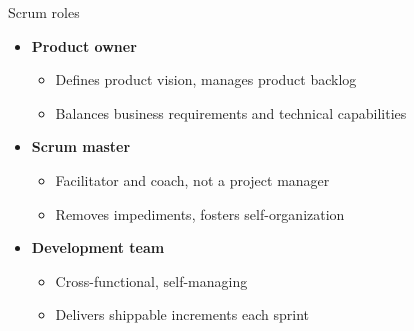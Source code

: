 \begin{frame}{Scrum roles}
  \begin{itemize}
    \item \textbf{Product owner}
      \begin{itemize}
        \item Defines product vision, manages product backlog
        \item Balances business requirements and technical capabilities
      \end{itemize}
    \item \textbf{Scrum master}
      \begin{itemize}
        \item Facilitator and coach, not a project manager
        \item Removes impediments, fosters self-organization
      \end{itemize}
    \item \textbf{Development team}
      \begin{itemize}
        \item Cross-functional, self-managing
        \item Delivers shippable increments each sprint
      \end{itemize}
  \end{itemize}
\end{frame}


